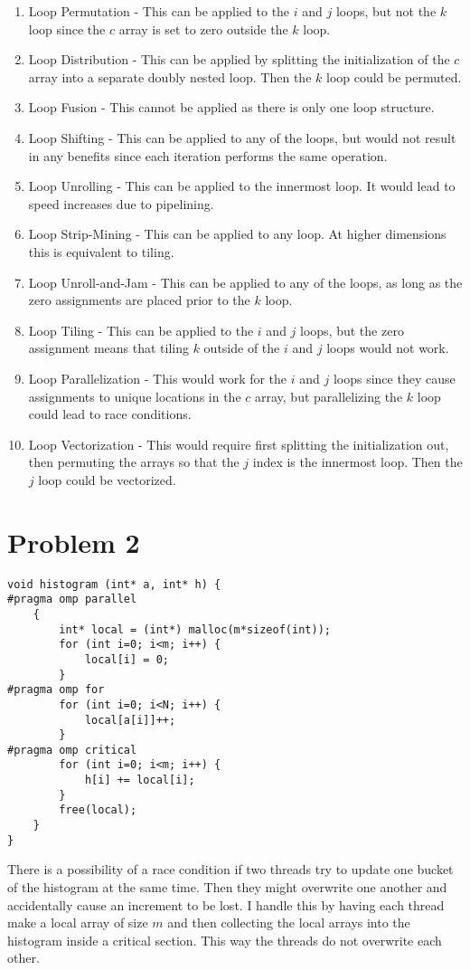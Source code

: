 \documentclass[12pt]{article}
\begin{document}
\begin{enumerate}
    \item Loop Permutation - This can be applied to the \(i\) and \(j\) loops, but not the \(k\) loop
    since the \(c\) array is set to zero outside the \(k\) loop.
    \item Loop Distribution - This can be applied by splitting the initialization of the \(c\) array
    into a separate doubly nested loop. Then the \(k\) loop could be permuted.
    \item Loop Fusion - This cannot be applied as there is only one loop structure.
    \item Loop Shifting - This can be applied to any of the loops, but would not result in any benefits
    since each iteration performs the same operation.
    \item Loop Unrolling - This can be applied to the innermost loop. It would lead to speed increases
    due to pipelining.
    \item Loop Strip-Mining - This can be applied to any loop. At higher dimensions this is equivalent
    to tiling.
    \item Loop Unroll-and-Jam - This can be applied to any of the loops, as long as the zero assignments
    are placed prior to the \(k\) loop.
    \item Loop Tiling - This can be applied to the \(i\) and \(j\) loops, but the zero assignment means that
    tiling \(k\) outside of the \(i\) and \(j\) loops would not work.
    \item Loop Parallelization - This would work for the \(i\) and \(j\) loops since they cause assignments
    to unique locations in the \(c\) array, but parallelizing the \(k\) loop could lead to race conditions.
    \item Loop Vectorization - This would require first splitting the initialization out, then permuting
    the arrays so that the \(j\) index is the innermost loop. Then the \(j\) loop could be vectorized.
\end{enumerate}

\section*{Problem 2}

\begin{verbatim}
void histogram (int* a, int* h) {
#pragma omp parallel
    {
        int* local = (int*) malloc(m*sizeof(int));
        for (int i=0; i<m; i++) {
            local[i] = 0;
        }
#pragma omp for
        for (int i=0; i<N; i++) {
            local[a[i]]++;
        }
#pragma omp critical
        for (int i=0; i<m; i++) {
            h[i] += local[i];
        }
        free(local);
    }
}
\end{verbatim}
There is a possibility of a race condition if two threads try to update one bucket of the histogram at the
same time. Then they might overwrite one another and accidentally cause an increment to be lost. I handle
this by having each thread make a local array of size \(m\) and then collecting the local arrays into
the histogram inside a critical section. This way the threads do not overwrite each other.
\end{document}
